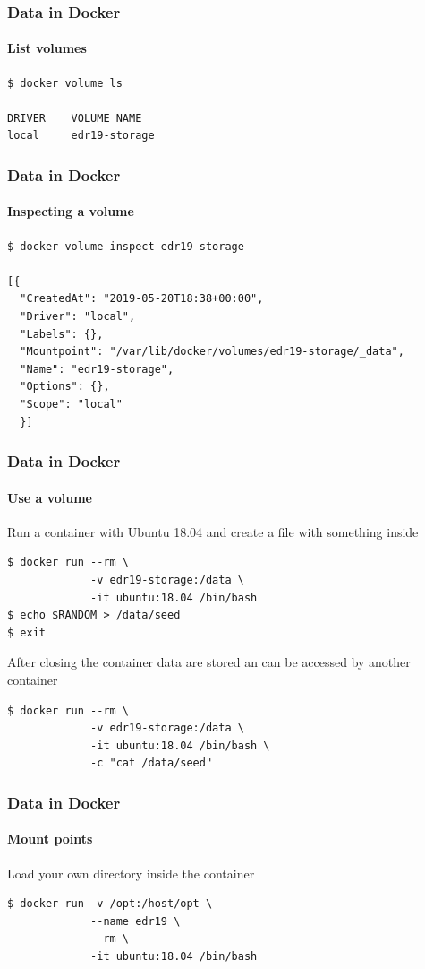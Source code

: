 \begin{frame}[fragile]
\frametitle{Data in Docker}
\framesubtitle{List volumes}


\begin{lstlisting}
$ docker volume ls

DRIVER    VOLUME NAME
local     edr19-storage
\end{lstlisting}
\end{frame}

\begin{frame}[fragile]
\frametitle{Data in Docker}
\framesubtitle{Inspecting a volume}
\begin{lstlisting}[breaklines=true]
$ docker volume inspect edr19-storage

[{
  "CreatedAt": "2019-05-20T18:38+00:00",
  "Driver": "local",
  "Labels": {},
  "Mountpoint": "/var/lib/docker/volumes/edr19-storage/_data",
  "Name": "edr19-storage",
  "Options": {},
  "Scope": "local"
  }]
\end{lstlisting}

\end{frame}

\begin{frame}[fragile]
\frametitle{Data in Docker}
\framesubtitle{Use a volume}

Run a container with Ubuntu 18.04 and create a file with something inside
\begin{lstlisting}
$ docker run --rm \
             -v edr19-storage:/data \
             -it ubuntu:18.04 /bin/bash 
$ echo $RANDOM > /data/seed
$ exit
\end{lstlisting}

After closing the container data are stored an can be accessed
by another container

\begin{lstlisting}
$ docker run --rm \
             -v edr19-storage:/data \
             -it ubuntu:18.04 /bin/bash \
             -c "cat /data/seed"
\end{lstlisting}
\end{frame}

\begin{frame}[fragile]
\frametitle{Data in Docker}
\framesubtitle{Mount points}

Load your own directory inside the container

\begin{lstlisting}
$ docker run -v /opt:/host/opt \
             --name edr19 \
             --rm \
             -it ubuntu:18.04 /bin/bash
\end{lstlisting}
\end{frame}


